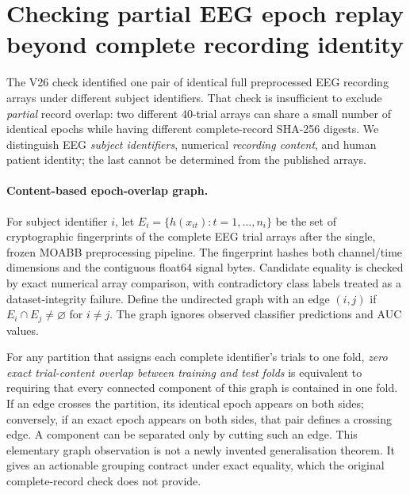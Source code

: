 \section{Checking partial EEG epoch replay beyond complete recording identity}
\label{sec:v27-epoch-identity}
The V26 check identified one pair of identical full
preprocessed EEG recording arrays under different subject identifiers.
That check is insufficient to exclude \emph{partial} record overlap:
two different 40-trial arrays can share a small number of identical
epochs while having different complete-record SHA-256 digests.
We distinguish EEG \emph{subject identifiers}, numerical
\emph{recording content}, and human patient identity; the last
cannot be determined from the published arrays.

\paragraph{Content-based epoch-overlap graph.}
For subject identifier $i$, let
$E_i=\{h(x_{it}):t=1,\ldots,n_i\}$ be the set of
cryptographic fingerprints of the complete EEG trial arrays
after the single, frozen MOABB preprocessing pipeline. The
fingerprint hashes both channel/time dimensions and the contiguous
float64 signal bytes. Candidate equality is checked by exact
numerical array comparison, with contradictory class labels
treated as a dataset-integrity failure.
Define the undirected graph with an edge $(i,j)$ if
$E_i\cap E_j\ne\varnothing$ for $i\ne j$.
The graph ignores observed classifier predictions and AUC values.

For any partition that assigns each complete identifier's
trials to one fold, \emph{zero exact trial-content overlap between
training and test folds} is equivalent to requiring that
every connected component of this graph is contained in
one fold. If an edge crosses the partition, its identical
epoch appears on both sides; conversely, if an exact epoch
appears on both sides, that pair defines a crossing edge.
A component can be separated only by cutting such an edge.
This elementary graph observation is not a newly invented
generalisation theorem. It gives an actionable grouping
contract under exact equality, which the original
complete-record check does not provide.

